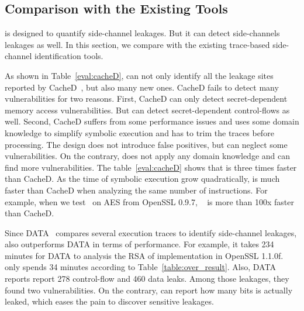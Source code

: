 \subsection{Comparison with the Existing Tools}
\label{eval:scala}


\tool{} is designed to quantify side-channel leakages. But it can detect
side-channels leakages as well. In this section, we compare \tool{} with the
existing trace-based side-channel identification tools.

As shown in Table~\ref{eval:cacheD},
\tool{} can not only identify all the leakage sites reported by CacheD~\cite{203878}, but also
many new ones. CacheD fails to detect many vulnerabilities for two
reasons. First, CacheD can only detect secret-dependent memory access
vulnerabilities. But \tool{} can detect secret-dependent control-flows as well.
Second, CacheD suffers from some performance issues and uses some domain
knowledge to simplify symbolic execution and has to trim the traces before
processing. The design does not introduce false positives, but can neglect some
vulnerabilities. On the contrary, \tool{} does not apply any domain knowledge
and can find more vulnerabilities. The table~\ref{eval:cacheD} shows that
\tool{} is three times faster than CacheD. As the time of symbolic execution
grow quadratically, \tool{} is much faster than CacheD when analyzing the same
number of instructions. For example, when we test~\tool{} on AES from OpenSSL
0.9.7, ~\tool{} is more than 100x faster than CacheD.

Since DATA~\cite{217537} compares several execution traces to identify
side-channel leakages, \tool{} also outperforms DATA in terms of performance.
For example, it takes 234 minutes for DATA to analysis the RSA of implementation
in OpenSSL 1.1.0f. \tool{} only spends 34 minutes according to Table~\ref{table:over_result}.
Also, DATA reports report 278 control-flow and 460 data leaks. Among those leakages,
they found two vulnerabilities. On the contrary, \tool{} can report how many bits is
actually leaked, which eases the pain to discover sensitive leakages.

